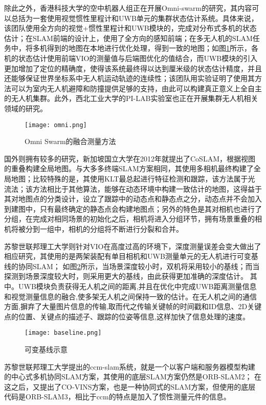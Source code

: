除此之外，香港科技大学的空中机器人组正在开展Omni-swarm的研究，其内容可以总括为一套使用视觉惯性里程计和UWB单元的集群状态估计系统。具体来说，该团队使用全方向的视觉+惯性里程计和UWB模块的，完成对分布式多机的状态估计；在SLAM前端的设计上，使用了全方向的感知前端；在多无人机的SLAM任务中，将多机得到的地图在本地进行优化处理，得到一致的地图；如图\ref{fig-omni}所示，各机的状态估计使用前端VIO的测量值与后端图优化的值结合，而UWB模块的引入更加增加了定位的精确度，使得该系统最终得以达到厘米级的状态估计精度，并且还能够保证世界坐标系中无人机运动轨迹的连续性；该团队用实验证明了使用其方法可以为室内无人机避障和防撞提供足够的支持，由此可以构建真正意义上全自主的无人机集群\cite{omniSwarm}。此外，西北工业大学的PI-LAB实验室也正在开展集群无人机相关领域的研究。

\begin{figure}[!ht]
	\centering
	\texttt{[image: omni.png]}
	\caption{Omni Swarm的融合测量方法} 
	\label{fig-omni}
\end{figure}

国外则拥有较多的研究，新加坡国立大学在2012年就提出了CoSLAM，根据视图的重叠构建全局地图\cite{zou2012coslam}。与大多多终端SLAM方案相同，其使用多相机最终构建了全局地图；比较特殊的是，其使用KLT最总起进行特征检测和跟踪，该方法属于光流法；该方法相比于其他算法，能够在动态环境中构建一致估计的地图，这得益于其对地图点的分类设计，设立了跟踪中的动态点和静态点之分，动态点并不会加入到建图中，只有最终确定的静态点会构建地图点；另外的特色是其对相机也进行了分组，在完成对相同场景的初始化之后，相机将进入分组环节，拥有场景重叠的相机将被分到一组中，相机的分组将不断进行分裂和合并。

苏黎世联邦理工大学则针对VIO在高度过高的环境下，深度测量误差会变大做出了相应研究，其使用的是两架装配有单目相机和UWB测量单元的无人机进行可变基线的协同SLAM；
如图\ref{fig-baseline}所示，当场景深度较小时，双机将采用较小的基线；而当探测到场景深度较大时，则采用更大的基线，由此获得更加准确的深度估计。
其中。UWB模块负责获得无人机之间的距离,并且在优化中完成UWB距离测量信息和视觉测量信息的融合,使多架无人机之间保持一致的估计。在无人机之间的通信方面,摒弃了大量图片信息的传输,取而代之传输关键帧的时间戳和ID信息、2D关键点的位置、关键点的描述子、跟踪的位姿等信息,这样加快了信息处理的速度\cite{karrer2021distributed}。

\begin{figure}[!ht]
	\centering
	\texttt{[image: baseline.png]}
	\caption{可变基线示意} 
	\label{fig-baseline}
\end{figure}

苏黎世联邦理工大学提出的ccm-slam系统，就是一个以客户端和服务器模型构建的中心式多机协同SLAM方案，其使用的底层SLAM方案仍然是ORB-SLAM2\cite{schmuck2019ccm}；
在这之后，又提出了CO-VINS方案，也是一种协同式的SLAM方案，但使用的底层代码是ORB-SLAM3\cite{9585827}，相比于ccm的特点是加入了惯性测量元件的信息。

